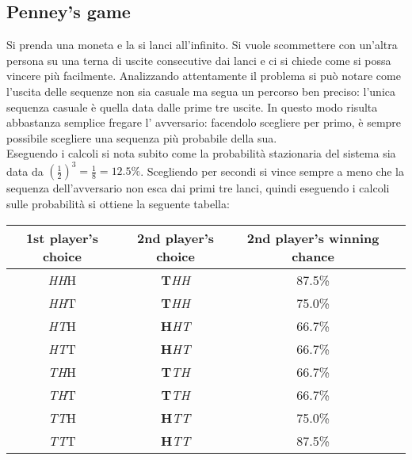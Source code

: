 \documentclass[12pt, a4paper]{article}
\theoremstyle{theorem}
\begin{document}
		\subsection{Penney's game}
			Si prenda una moneta e la si lanci all'infinito.
			Si vuole scommettere con un'altra persona su una terna di uscite consecutive dai lanci e ci si chiede come si possa vincere più facilmente.
			Analizzando attentamente il problema si può notare come l'uscita delle sequenze non sia casuale ma segua un percorso ben preciso: l'unica sequenza casuale è quella data dalle prime tre uscite.
			In questo modo risulta abbastanza semplice fregare l' avversario: facendolo scegliere per primo, è sempre possibile scegliere una sequenza più probabile della sua.\\
			Eseguendo i calcoli si nota subito come la probabilità stazionaria del sistema sia data da $\left(\frac{1}{2}\right)^3=\frac{1}{8}=12.5\%$.
			Scegliendo per secondi si vince sempre a meno che la sequenza dell'avversario non esca dai primi tre lanci, quindi eseguendo i calcoli sulle probabilità si ottiene la seguente tabella:
			\begin{center}
				\begin{tabular}{ |c|c|c|c| } 
					\hline
					1st player's choice& 2nd player's choice & 2nd player's winning chance\\
					\hline
					\emph{HH}H & \textbf{T}\emph{HH} & 87.5\% \\
					\emph{HH}T & \textbf{T}\emph{HH} & 75.0\% \\
					\emph{HT}H & \textbf{H}\emph{HT} & 66.7\% \\
					\emph{HT}T & \textbf{H}\emph{HT} & 66.7\% \\
					\emph{TH}H & \textbf{T}\emph{TH} & 66.7\% \\
					\emph{TH}T & \textbf{T}\emph{TH} & 66.7\% \\
					\emph{TT}H & \textbf{H}\emph{TT} & 75.0\% \\
					\emph{TT}T & \textbf{H}\emph{TT} & 87.5\% \\
					\hline
				\end{tabular}
			\end{center}
\end{document}
